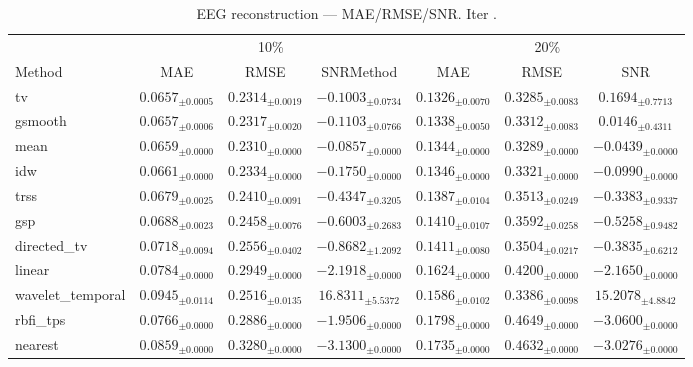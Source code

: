 ﻿%
\begin{table}[ht]
\centering
\caption[EEG reconstruction - Iteration it36]{EEG reconstruction — MAE/RMSE/SNR. Iter .}
\label{tab:main_it36_3syn_beta_low_missing}
\small
\begin{tabular}{lcccccc}
\toprule
\multicolumn{1}{c}{} & \multicolumn{3}{c}{10\%} & \multicolumn{3}{c}{20\%} \\
\cmidrule(lr){2-4} \cmidrule(lr){5-7}
Method & MAE & RMSE & SNRMethod & MAE & RMSE & SNR \\
\midrule
tv & $0.0657_{\pm 0.0005}$ & $0.2314_{\pm 0.0019}$ & $-0.1003_{\pm 0.0734}$ & $0.1326_{\pm 0.0070}$ & $0.3285_{\pm 0.0083}$ & $0.1694_{\pm 0.7713}$ \\
gsmooth & $0.0657_{\pm 0.0006}$ & $0.2317_{\pm 0.0020}$ & $-0.1103_{\pm 0.0766}$ & $0.1338_{\pm 0.0050}$ & $0.3312_{\pm 0.0083}$ & $0.0146_{\pm 0.4311}$ \\
mean & $0.0659_{\pm 0.0000}$ & $0.2310_{\pm 0.0000}$ & $-0.0857_{\pm 0.0000}$ & $0.1344_{\pm 0.0000}$ & $0.3289_{\pm 0.0000}$ & $-0.0439_{\pm 0.0000}$ \\
idw & $0.0661_{\pm 0.0000}$ & $0.2334_{\pm 0.0000}$ & $-0.1750_{\pm 0.0000}$ & $0.1346_{\pm 0.0000}$ & $0.3321_{\pm 0.0000}$ & $-0.0990_{\pm 0.0000}$ \\
trss & $0.0679_{\pm 0.0025}$ & $0.2410_{\pm 0.0091}$ & $-0.4347_{\pm 0.3205}$ & $0.1387_{\pm 0.0104}$ & $0.3513_{\pm 0.0249}$ & $-0.3383_{\pm 0.9337}$ \\
gsp & $0.0688_{\pm 0.0023}$ & $0.2458_{\pm 0.0076}$ & $-0.6003_{\pm 0.2683}$ & $0.1410_{\pm 0.0107}$ & $0.3592_{\pm 0.0258}$ & $-0.5258_{\pm 0.9482}$ \\
directed\_tv & $0.0718_{\pm 0.0094}$ & $0.2556_{\pm 0.0402}$ & $-0.8682_{\pm 1.2092}$ & $0.1411_{\pm 0.0080}$ & $0.3504_{\pm 0.0217}$ & $-0.3835_{\pm 0.6212}$ \\
linear & $0.0784_{\pm 0.0000}$ & $0.2949_{\pm 0.0000}$ & $-2.1918_{\pm 0.0000}$ & $0.1624_{\pm 0.0000}$ & $0.4200_{\pm 0.0000}$ & $-2.1650_{\pm 0.0000}$ \\
wavelet\_temporal & $0.0945_{\pm 0.0114}$ & $0.2516_{\pm 0.0135}$ & $16.8311_{\pm 5.5372}$ & $0.1586_{\pm 0.0102}$ & $0.3386_{\pm 0.0098}$ & $15.2078_{\pm 4.8842}$ \\
rbfi\_tps & $0.0766_{\pm 0.0000}$ & $0.2886_{\pm 0.0000}$ & $-1.9506_{\pm 0.0000}$ & $0.1798_{\pm 0.0000}$ & $0.4649_{\pm 0.0000}$ & $-3.0600_{\pm 0.0000}$ \\
nearest & $0.0859_{\pm 0.0000}$ & $0.3280_{\pm 0.0000}$ & $-3.1300_{\pm 0.0000}$ & $0.1735_{\pm 0.0000}$ & $0.4632_{\pm 0.0000}$ & $-3.0276_{\pm 0.0000}$ \\

\end{tabular}
\end{table}

